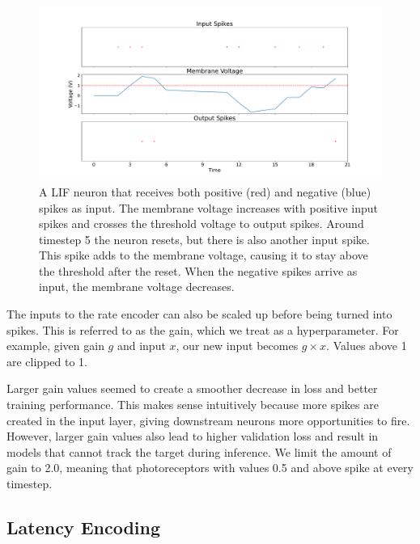 \documentclass [MS] {UCLAthesis}
\begin{document}
\begin{figure}
    \centering
    \includegraphics[width=\textwidth]{negative_spike_example}
    \caption[Negative spike inputs to a LIF neuron]{A LIF neuron that receives both positive (red) and negative (blue) spikes as input. The membrane voltage increases with positive input spikes and crosses the threshold voltage to output spikes. Around timestep 5 the neuron resets, but there is also another input spike. This spike adds to the membrane voltage, causing it to stay above the threshold after the reset. When the negative spikes arrive as input, the membrane voltage decreases.}
    \label{fig:negative_spike_example}
\end{figure}

The inputs to the rate encoder can also be scaled up before being turned into spikes. This is referred to as the gain, which we treat as a hyperparameter. For example, given gain $g$ and input $x$, our new input becomes $g\times x$. Values above 1 are clipped to 1.

Larger gain values seemed to create a smoother decrease in loss and better training performance. This makes sense intuitively because more spikes are created in the input layer, giving downstream neurons more opportunities to fire. However, larger gain values also lead to higher validation loss and result in models that cannot track the target during inference. We limit the amount of gain to 2.0, meaning that photoreceptors with values 0.5 and above spike at every timestep.



\subsection{Latency Encoding}
\end{document}

